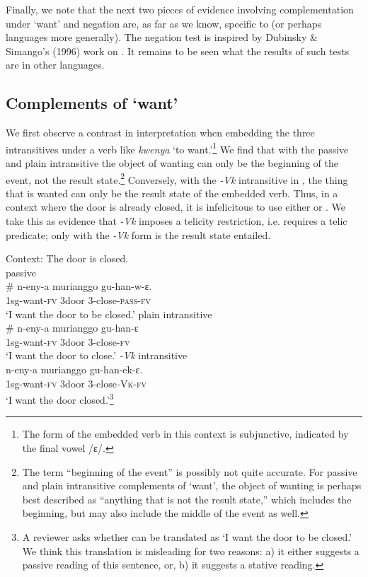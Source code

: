 \documentclass[output=paper]{langsci/lanmgscibook}
\begin{document}
Finally, we note that the next two pieces of evidence involving complementation under ‘want’ and negation are, as far as we know, specific to  (or perhaps  languages more generally). The negation test is inspired by Dubinsky \& Simango’s (1996) work on . It remains to be seen what the results of such tests are in other languages. 

\subsection{Complements of ‘want’}

We first observe a contrast in interpretation when embedding the three intransitives under a verb like \textit{kwenya} ‘to want.’\footnote{The form of the embedded verb in this context is subjunctive, indicated by the final vowel /ɛ/.} We find that with the passive  and plain intransitive  the object of wanting can only be the beginning of the event, not the result state.\footnote{The term “beginning of the event” is possibly not quite accurate. For passive and plain intransitive complements of ‘want’, the object of wanting is perhaps best described as “anything that is not the result state,” which includes the beginning, but may also include the middle of the event as well.}  Conversely, with the \textit{-Vk} intransitive in , the thing that is wanted can only be the result state of the embedded verb. Thus, in a context where the door is already closed, it is infelicitous to use either  or . We take this as evidence that \textit{-Vk} imposes a telicity restriction, i.e. requires a telic predicate; only with the \textit{-Vk} form is the result state entailed.

\ea\label{ex:gluckman:12} 
{Context: The door is closed.}\\
  \ea\label{ex:gluckman:12a}
  {{passive}}\\
  \gll   \# n-eny-a       murianggo gu-han-w-ɛ.\\
      {}  1sg-want-\textsc{fv} 3door         3-close-\textsc{pass}-\textsc{fv}\\
  \glt ‘I want the door to be closed.’
  \ex\label{ex:gluckman:12b}
  {  {plain intransitive}}\\
  \gll   \# n-eny-a       murianggo gu-han-ɛ\\
      {}  1sg-want-\textsc{fv} 3door        3-close-\textsc{fv}\\
  \glt ‘I want the door to close.’
  \ex\label{ex:gluckman:12c}
  {{\textit{-Vk}} {intransitive}}\\
  \gll   n-eny-a         murianggo gu-han-ek-ɛ.\\
	1sg-want-\textsc{fv} 3door        3-close\textit{-}\textsc{Vk}-\textsc{fv}\\
  \glt ‘I want the door closed.’\footnote{A reviewer asks whether  can be translated as ‘I want the door to be closed.’ We think this translation is misleading for two reasons: a) it either suggests a passive reading of this sentence, or, b) it suggests a stative reading.}
  \z
\z
\end{document}

